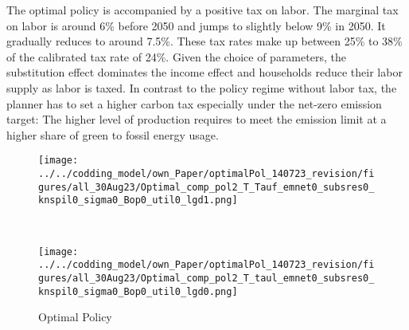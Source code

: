 The optimal policy is accompanied by a positive tax on labor. The marginal tax on labor is around 6\% before 2050 and jumps to slightly below 9\% in 2050. It gradually reduces to around 7.5\%. These tax rates make up between 25\% to 38\% of the calibrated tax rate of 24\%.  Given the choice of parameters, the substitution effect dominates the income effect and households reduce their labor supply as labor is taxed. In contrast to the policy regime without labor tax, the planner has to set a higher carbon tax especially under the net-zero emission target: The higher level of production requires to meet the emission limit at a higher share of green to fossil energy usage. 

\begin{figure}[h!!]
	\centering
	\caption{Optimal Policy }\label{fig:optPol}
	\begin{minipage}[]{0.45\textwidth}
		\texttt{[image: ../../codding\_model/own\_Paper/optimalPol\_140723\_revision/figures/all\_30Aug23/Optimal\_comp\_pol2\_T\_Tauf\_emnet0\_subsres0\_knspil0\_sigma0\_Bop0\_util0\_lgd1.png]}
	\end{minipage}
	\begin{minipage}[]{0.05\textwidth}
		\
	\end{minipage}
	\begin{minipage}[]{0.45\textwidth}
		\texttt{[image: ../../codding\_model/own\_Paper/optimalPol\_140723\_revision/figures/all\_30Aug23/Optimal\_comp\_pol2\_T\_taul\_emnet0\_subsres0\_knspil0\_sigma0\_Bop0\_util0\_lgd0.png]}
	\end{minipage}
\end{figure} 

